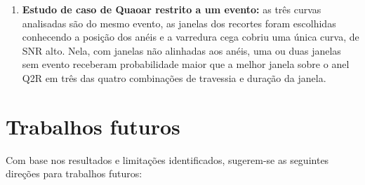 \documentclass[msc]{on} %
\providecommand{\DIFaddtex}[1]{{\protect\color{red}#1}} %
\providecommand{\DIFaddend}{} %
\providecommand{\DIFadd}[1]{\texorpdfstring{\DIFaddtex{#1}}{#1}} %
\begin{document}
\begin{enumerate}
	\item \textbf{\DIFadd{Estudo de caso de Quaoar restrito a um evento:}} \DIFadd{as três curvas analisadas são do mesmo evento, as janelas dos recortes foram escolhidas conhecendo a posição dos anéis e a varredura cega cobriu uma única curva, de SNR alto. Nela, com janelas não alinhadas aos anéis, uma ou duas janelas sem evento receberam probabilidade maior que a melhor janela sobre o anel Q2R em três das quatro combinações de travessia e duração da janela.
}\DIFaddend \end{enumerate}

\section{Trabalhos futuros}

Com base nos resultados e limitações identificados, sugerem-se as seguintes direções para trabalhos futuros:
\end{document}
